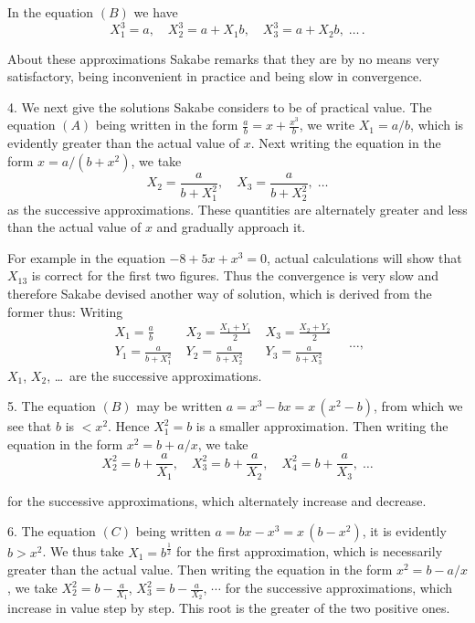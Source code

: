 \documentclass[11pt]{article}
\newcommand{\scanpage}[2]{\clearpage\setcounter{footnote}{0}\noindent{\footnotesize\color{gray}PDF page #1 · #2}\par\medskip}
\begin{document}
In the equation $(B)$ we have
\[
X_1^3 = a, \quad X_2^3 = a + X_1b, \quad X_3^3 = a + X_2b, \;\ldots\,.
\]

About these approximations Sakabe remarks that they are by no means very satisfactory, being inconvenient in practice and being slow in convergence.

4. We next give the solutions Sakabe considers to be of practical value. The equation $(A)$ being written in the form $\frac{a}{b} = x + \frac{x^3}{b}$, we write $X_1 = a/b$, which is evidently greater than the actual value of $x$. Next writing the equation in the form $x = a/(b + x^2)$, we take
\[
X_2 = \frac{a}{b + X_1^2}, \quad X_3 = \frac{a}{b + X_2^2}, \;\ldots
\]
as the successive approximations. These quantities are alternately greater and less than the actual value of $x$ and gradually approach it.

For example in the equation $-8 + 5x + x^3 = 0$, actual calculations will show that $X_{13}$ is correct for the first two figures. Thus the convergence is very slow and therefore Sakabe devised another way of solution, which is derived from the former thus: Writing
\[
\begin{array}{l|l|l|}
X_1 = \frac{a}{b} & \;X_2 = \frac{X_1 + Y_1}{2} & \;X_3 = \frac{X_2 + Y_2}{2} \\[3mm]
Y_1 = \frac{a}{b + X_1^2} & \;Y_2 = \frac{a}{b + X_2^2} & \;Y_3 = \frac{a}{b + X_3^2}
\end{array}
\quad \ldots,
\]
$X_1$, $X_2$, \ldots\ are the successive approximations.

5. The equation $(B)$ may be written $a = x^3 - bx = x\,(x^2 - b)$, from which we see that $b$ is $< x^2$. Hence $X_1^2 = b$ is a smaller approximation. Then writing the equation in the form $x^2 = b + a/x$, we take
\[
X_2^2 = b + \frac{a}{X_1}, \quad X_3^2 = b + \frac{a}{X_2}, \quad X_4^2 = b + \frac{a}{X_3}, \;\ldots
\]

\scanpage{0277}{printed page 263}
\noindent for the successive approximations, which alternately increase and decrease.

6. The equation $(C)$ being written $a = bx - x^3 = x\,(b - x^2)$, it is evidently $b > x^2$. We thus take $X_1 = b^{\frac{1}{2}}$ for the first approximation, which is necessarily greater than the actual value. Then writing the equation in the form $x^2 = b - a/x$, we take $X_2^2 = b - \frac{a}{X_1}$, $X_3^2 = b - \frac{a}{X_2}$, $\cdots$ for the successive approximations, which increase in value step by step. This root is the greater of the two positive ones.
\end{document}
